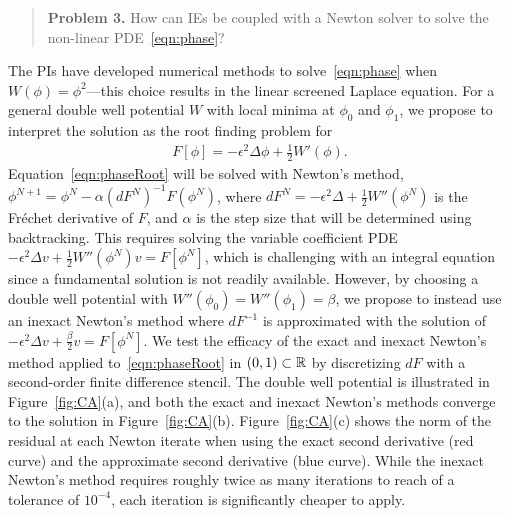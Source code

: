 \begin{quotation}
  \noindent
  \textbf{Problem 3.} How can IEs be coupled with a Newton solver to
  solve the non-linear PDE~\eqref{eqn:phase}?
\end{quotation}

The PIs have developed numerical methods to solve~\eqref{eqn:phase} when
$W(\phi) = \phi^2$---this choice results in the linear screened Laplace
equation. For a general double well potential $W$ with local minima at
$\phi_0$ and $\phi_1$, we propose to interpret the solution as the root
finding problem for
\begin{align}
  \label{eqn:phaseRoot}
  F[\phi] = -\epsilon^2 \Delta \phi + \tfrac{1}{2}W'(\phi).
\end{align}
Equation~\eqref{eqn:phaseRoot} will be solved with Newton's method,
$\phi^{N+1} = \phi^{N} - \alpha (dF^N)^{-1} F(\phi^N)$, where $dF^N =
-\epsilon^2 \Delta + \tfrac{1}{2}W''(\phi^N)$ is the Fr\'{e}chet
derivative of $F$, and $\alpha$ is the step size that will be determined
using backtracking. This requires solving the variable coefficient PDE
$-\epsilon^2 \Delta v + \tfrac{1}{2}W''(\phi^{N}) v = F[\phi^N]$, which
is challenging with an integral equation since a fundamental solution is
not readily available. However, by choosing a double well potential with
$W''(\phi_0) = W''(\phi_1) = \beta$, we propose to instead use an
inexact Newton's method where $dF^{-1}$ is approximated with the
solution of $-\epsilon^2 \Delta v + \tfrac{\beta}{2} v = F[\phi^N]$. We
test the efficacy of the exact and inexact Newton's method applied
to~\eqref{eqn:phaseRoot} in $(0,1) \subset \mathbb{R}$ by discretizing $dF$
with a second-order finite difference stencil. The double well potential
is illustrated in Figure~\ref{fig:CA}(a), and both the exact and inexact
Newton's methods converge to the solution in Figure~\ref{fig:CA}(b).
Figure~\ref{fig:CA}(c) shows the norm of the residual at each Newton
iterate when using the exact second derivative (red curve) and the
approximate second derivative (blue curve). While the inexact Newton's
method requires roughly twice as many iterations to reach of a tolerance
of $10^{-4}$, each iteration is significantly cheaper to apply.

